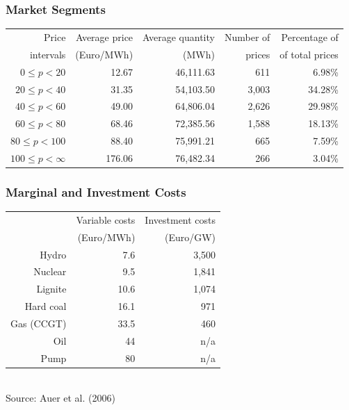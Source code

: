 \begin{frame}
  \frametitle{Market Segments}

\begin{center}
\small
\begin{tabular}{rrrrr}
  \hline
Price & Average price  & Average quantity & Number of & Percentage of \\
intervals& (Euro/MWh) &  (MWh) &  prices & of total prices\\
  \hline\hline
$0\leq p<20$ & 12.67 & 46,111.63 & 611 & 6.98\% \\
$20\leq p<40$ & 31.35 & 54,103.50 & 3,003 & 34.28\% \\
$40\leq p<60$ & 49.00 & 64,806.04 & 2,626 & 29.98\% \\
$60\leq p<80$ & 68.46 & 72,385.56 & 1,588 & 18.13\% \\
$80\leq p<100$ & 88.40 & 75,991.21 & 665 & 7.59\% \\
$100\leq p<\infty$& 176.06 & 76,482.34 & 266 & 3.04\% \\
   \hline
\end{tabular}  
\normalsize
\end{center}

\end{frame}


\begin{frame}
  \frametitle{Marginal and Investment Costs}
\begin{center}
  \begin{tabular}{rrr}
\hline
           & Variable costs & Investment costs\\
           &  (Euro/MWh)    &  (Euro/GW) \\
\hline\hline
     Hydro &        7.6 &    3,500\\

   Nuclear &        9.5 &    1,841 \\

   Lignite &       10.6 &    1,074 \\

 Hard coal &       16.1 &     971 \\

 Gas (CCGT) &       33.5 &     460 \\

Oil & 44            &   n/a\\

Pump &         80 &       n/a\\
\hline
\end{tabular}
\\
\vspace{0.3cm}
\scriptsize Source: Auer et al. (2006)
\end{center}
\end{frame}


